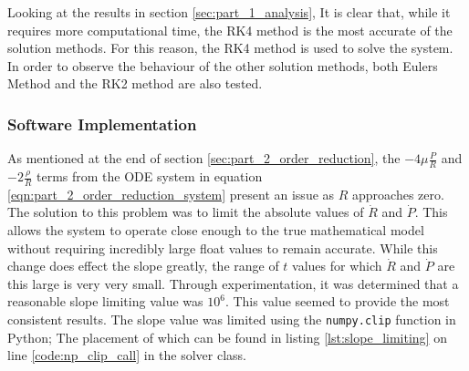 \documentclass[12pt]{article}
\begin{document}
Looking at the results in section \ref{sec:part_1_analysis}, It is clear that, while it requires more computational time, the RK4 method is the most accurate of the solution methods. For this reason, the RK4 method is used to solve the system. In order to observe the behaviour of the other solution methods, both Eulers Method and the RK2 method are also tested.

\subsubsection{Software Implementation} \label{sec:part_2_software_impl}

As mentioned at the end of section \ref{sec:part_2_order_reduction}, the $-4\mu \frac{P}{R}$ and $-2 \frac{\rho}{R}$ terms from the ODE system in equation \ref{eqn:part_2_order_reduction_system} present an issue as $R$ approaches zero. The solution to this problem was to limit the absolute values of $\dot R$ and $\dot P$. This allows the system to operate close enough to the true mathematical model without requiring incredibly large float values to remain accurate. While this change does effect the slope greatly, the range of $t$ values for which $\dot R$ and $\dot P$ are this large is very very small. Through experimentation, it was determined that a reasonable slope limiting value was $10^6$. This value seemed to provide the most consistent results. The slope value was limited using the \texttt{numpy.clip} function in Python; The placement of which can be found in listing \ref{lst:slope_limiting} on line \ref{code:np_clip_call} in the solver class.


\end{document}

